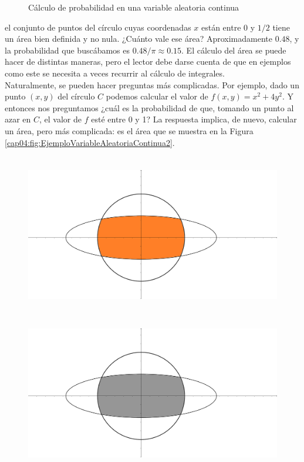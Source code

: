 \begin{Ejemplo}
\begin{figure}[h]
\begin{bn}
	\end{bn}
	\caption{Cálculo de probabilidad en una variable aleatoria continua}
	\label{cap04:fig:EjemploVariableAleatoriaContinua}
    \end{figure}
el conjunto de puntos del círculo cuyas coordenadas $x$ están entre $0$ y $1/2$ tiene un área bien definida y no nula. ¿Cuánto vale ese área? Aproximadamente $0.48$, y la probabilidad que buscábamos es $0.48/\pi\approx 0.15$. El cálculo del área se puede hacer de distintas maneras, pero el lector debe darse cuenta de que en ejemplos como este se necesita a veces recurrir al cálculo de integrales.\\
    Naturalmente, se pueden hacer preguntas más complicadas. Por ejemplo, dado un punto $(x,y)$ del círculo $C$ podemos calcular el valor de $f(x,y)=x^2+ 4y^2$. Y entonces nos preguntamos ¿cuál es la probabilidad de que, tomando un punto al azar en $C$, el valor de $f$ esté entre 0 y 1? La respuesta implica, de nuevo, calcular un área, pero más complicada: es el área que se muestra en la Figura \ref{cap04:fig:EjemploVariableAleatoriaContinua2}.
    \begin{figure}[h]
	\centering
	\begin{enColor}
    \includegraphics[height=7cm]{../fig/Cap04-Figura02-VariableAleatoriaContinua.png}
	\end{enColor}
	\begin{bn}
    \includegraphics[height=7cm]{../fig/Cap04-Figura02-VariableAleatoriaContinua-bn.png}

\end{bn}
\end{figure}
\end{Ejemplo}
